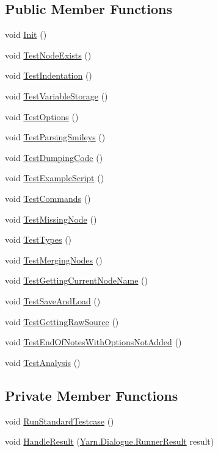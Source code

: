 \subsection*{Public Member Functions}
\begin{DoxyCompactItemize}
\item 
void \hyperlink{a00091_a1a64841e6815e57869c1132427a44349}{Init} ()
\item 
void \hyperlink{a00091_a2beee99e50888b2813bb4cb1b5d7db1f}{Test\-Node\-Exists} ()
\item 
void \hyperlink{a00091_a7367e28f0328bc09e1129c2c86026d34}{Test\-Indentation} ()
\item 
void \hyperlink{a00091_aa27a8cd7c1926ae4d92956a5f6a24d9e}{Test\-Variable\-Storage} ()
\item 
void \hyperlink{a00091_aecbebd20a89e19887c38cc45deb33551}{Test\-Options} ()
\item 
void \hyperlink{a00091_a9d1192dcf67863cfc835368d1c14916f}{Test\-Parsing\-Smileys} ()
\item 
void \hyperlink{a00091_a7ff97d839b8ce04eb6493afd4698c829}{Test\-Dumping\-Code} ()
\item 
void \hyperlink{a00091_afe989298d1984b105f2f187a42d54134}{Test\-Example\-Script} ()
\item 
void \hyperlink{a00091_a95f63c81611bdee5f210c61201546658}{Test\-Commands} ()
\item 
void \hyperlink{a00091_addf4c602c21c9c541adee828f8b7c0f8}{Test\-Missing\-Node} ()
\item 
void \hyperlink{a00091_a2d3abf96f13b1a8f111952e5294ada67}{Test\-Types} ()
\item 
void \hyperlink{a00091_a65c83f97636c7d2c0ba63d1ed0fa7881}{Test\-Merging\-Nodes} ()
\item 
void \hyperlink{a00091_a8eaf016cf430c42648190a2fdd9e9ad2}{Test\-Getting\-Current\-Node\-Name} ()
\item 
void \hyperlink{a00091_aaa4a2d0a30511d5d12459e3bb470b615}{Test\-Save\-And\-Load} ()
\item 
void \hyperlink{a00091_a6ba6563aea2806d7ec783f0bb4d26932}{Test\-Getting\-Raw\-Source} ()
\item 
void \hyperlink{a00091_a3f4243133a4195c80f39469f2d9875d2}{Test\-End\-Of\-Notes\-With\-Options\-Not\-Added} ()
\item 
void \hyperlink{a00091_a7034c82755c2b23d547102aa41770df1}{Test\-Analysis} ()
\end{DoxyCompactItemize}
\subsection*{Private Member Functions}
\begin{DoxyCompactItemize}
\item 
void \hyperlink{a00091_a65293f2e8ed643371fefe8479842ce6a}{Run\-Standard\-Testcase} ()
\item 
void \hyperlink{a00091_a132f6bdec5940f30a11d3e8be05ce7e4}{Handle\-Result} (\hyperlink{a00083}{Yarn.\-Dialogue.\-Runner\-Result} result)
\end{DoxyCompactItemize}
